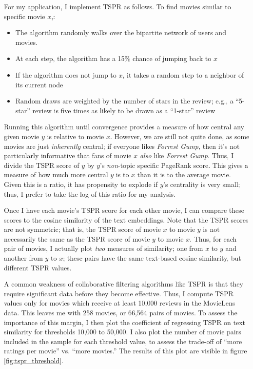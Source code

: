 \documentclass{article}
\begin{document}
For my application, I implement TSPR as follows. To find movies similar to specific movie $x$,:
\begin{itemize}
    \item The algorithm randomly walks over the bipartite network of users and movies. 
    \item At each step, the algorithm has a 15\% chance of jumping back to $x$
    \item If the algorithm does not jump to $x$, it takes a random step to a neighbor of its current node
    \item Random draws are weighted by the number of stars in the review; e.g., a ``5-star'' review is five times as likely to be drawn as a ``1-star'' review
\end{itemize}

Running this algorithm until convergence provides a measure of how central any given movie $y$ is relative to movie $x$. However, we are still not quite done, as some movies are just \emph{inherently} central; if everyone likes \emph{Forrest Gump,} then it's not particularly informative that fans of movie $x$ \emph{also} like \emph{Forrest Gump}. Thus, I divide the TSPR score of $y$ by $y$'s \emph{non}-topic specific PageRank score. This gives a measure of how much more central $y$ is to $x$ than it is to the average movie. Given this is a ratio, it has propensity to explode if $y$'s centrality is very small; thus, I prefer to take the log of this ratio for my analysis.

Once I have each movie's TSPR score for each other movie, I can compare these scores to the cosine similarity of the text embeddings. Note that the TSPR scores are not symmetric; that is, the TSPR score of movie $x$ to movie $y$ is not necessarily the same as the TSPR score of movie $y$ to movie $x$. Thus, for each pair of movies, I actually plot \emph{two} measures of similarity; one from $x$ to $y$ and another from $y$ to $x$; these pairs have the same text-based cosine similarity, but different TSPR values. 

A common weakness of collaborative filtering algorithms like TSPR is that they require significant data before they become effective. Thus, I compute TSPR values only for movies which receive at least 10,000 reviews in the MovieLens data. This leaves me with 258 movies, or 66,564 pairs of movies. To assess the importance of this margin, I then plot the coefficient of regressing TSPR on text similarity for thresholds 10,000 to 50,000. I also plot the number of movie pairs included in the sample for each threshold value, to assess the trade-off of ``more ratings per movie'' vs. ``more movies.'' The results of this plot are visible in figure \ref{fig:tspr_threshold}. 
\end{document}
